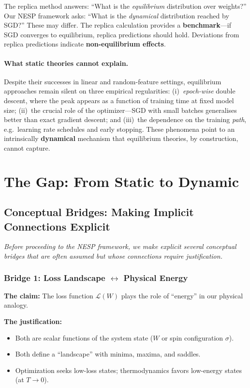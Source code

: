 \documentclass[
  journal=largetwo,
  year=2025,
  volume=37,
]{cup-journal}
\begin{document}
\begin{remark}
The replica method answers: ``What is the \textit{equilibrium} distribution over weights?'' Our NESP framework asks: ``What is the \textit{dynamical} distribution reached by SGD?'' These may differ. The replica calculation provides a \textbf{benchmark}---if SGD converges to equilibrium, replica predictions should hold. Deviations from replica predictions indicate \textbf{non-equilibrium effects}.
\end{remark}

\paragraph{What static theories cannot explain.}
Despite their successes in linear and random-feature settings, equilibrium approaches remain silent on three empirical regularities: (i)~\textit{epoch-wise} double descent, where the peak appears as a function of training time at fixed model size; (ii)~the crucial role of the optimizer---SGD with small batches generalises better than exact gradient descent; and (iii)~the dependence on the training \textit{path}, e.g.\ learning rate schedules and early stopping. These phenomena point to an intrinsically \textbf{dynamical} mechanism that equilibrium theories, by construction, cannot capture.

\section{The Gap: From Static to Dynamic}

\subsection{Conceptual Bridges: Making Implicit Connections Explicit}\label{sec:conceptual_bridges}

\textit{Before proceeding to the NESP framework, we make explicit several conceptual bridges that are often assumed but whose connections require justification.}

\subsubsection{Bridge 1: Loss Landscape $\leftrightarrow$ Physical Energy}

\textbf{The claim:} The loss function $\mathcal{L}(W)$ plays the role of ``energy'' in our physical analogy.

\textbf{The justification:}
\begin{itemize}
    \item Both are scalar functions of the system state ($W$ or spin configuration $\sigma$).
    \item Both define a ``landscape'' with minima, maxima, and saddles.
    \item Optimization seeks low-loss states; thermodynamics favors low-energy states (at $T \to 0$).
\end{itemize}
\end{document}
